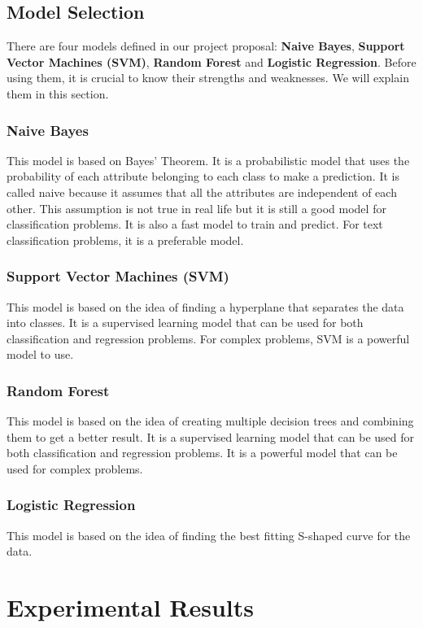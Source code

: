\documentclass[conference]{IEEEtran}
\begin{document}
\subsection{Model Selection}

There are four models defined in our project proposal: \textbf{Naive Bayes}, \textbf{Support Vector Machines (SVM)}, \textbf{Random Forest} and \textbf{Logistic Regression}. Before using them, it is crucial to know their strengths and weaknesses. We will explain them in this section.

\subsubsection{Naive Bayes}
This model is based on Bayes' Theorem. It is a probabilistic model that uses the probability of each attribute belonging to each class to make a prediction. It is called naive because it assumes that all the attributes are independent of each other. This assumption is not true in real life but it is still a good model for classification problems. It is also a fast model to train and predict. For text classification problems, it is a preferable model.

\subsubsection{Support Vector Machines (SVM)}
This model is based on the idea of finding a hyperplane that separates the data into classes. It is a supervised learning model that can be used for both classification and regression problems. For complex problems, SVM is a powerful model to use.

\subsubsection{Random Forest}
This model is based on the idea of creating multiple decision trees and combining them to get a better result. It is a supervised learning model that can be used for both classification and regression problems. It is a powerful model that can be used for complex problems.

\subsubsection{Logistic Regression}
This model is based on the idea of finding the best fitting S-shaped curve for the data.

\section{Experimental Results}
\end{document}

